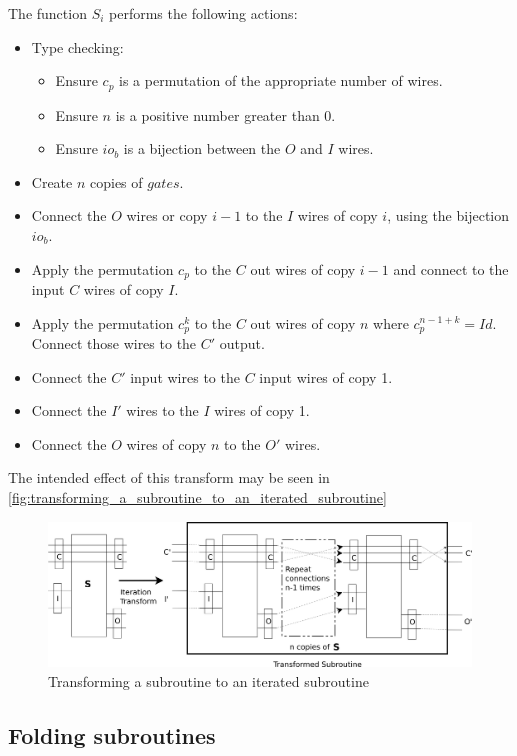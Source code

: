 The function $S_i$ performs the following actions:
\begin{itemize}
  \item Type checking:
  \begin{itemize}
    \item Ensure  $c_p$ is a permutation of the appropriate number of wires.
    \item Ensure $n$ is a positive number greater than 0.
    \item Ensure $io_b$ is a bijection between the $O$ and $I$ wires.
  \end{itemize}
  \item Create $n$ copies of $gates$.
  \item Connect the $O$ wires or copy $i-1$ to the $I$ wires of copy $i$, using the bijection
  $io_b$.
  \item Apply the permutation $c_p$ to the $C$ out wires of copy $i-1$ and connect to the input $C$
  wires of copy $I$.
  \item Apply the permutation $c_p^k$ to the $C$ out wires of copy $n$ where $c_p^{n-1+k} = Id$.
  Connect those wires to the $C'$ output.
  \item Connect the $C'$ input wires to the $C$ input wires of copy 1.
  \item Connect the $I'$ wires to the $I$ wires of copy 1.
  \item Connect the $O$ wires of copy $n$ to the $O'$ wires.
\end{itemize}

The intended effect of this transform may be seen in
\vref{fig:transforming_a_subroutine_to_an_iterated_subroutine}
\begin{figure}[htbp]
  \centering
     \includegraphics[scale=.4]{diagrams/SubroutineIterationTransform.png}
   \caption{Transforming a subroutine to an iterated subroutine}
   \label{fig:transforming_a_subroutine_to_an_iterated_subroutine}
\end{figure}

\subsection{Folding subroutines} %
\label{sub:folding_subroutines}

